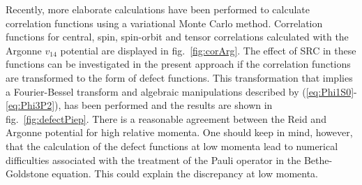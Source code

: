 Recently, more elaborate calculations\cite{PWP92} have been performed to  
calculate correlation functions using a variational Monte Carlo
method\cite{PWP92}. Correlation functions for central, spin, spin-orbit and 
tensor correlations calculated with the Argonne $v_{14}$  potential are 
displayed in fig.~\ref{fig:corArg}. 
The effect of SRC in these 
functions can be investigated in the present approach if the correlation 
functions are transformed to the form of defect functions. This transformation 
that implies a Fourier-Bessel transform and algebraic manipulations described 
by (\ref{eq:Phi1S0}-\ref{eq:Phi3P2}), has been performed and the results are 
shown in fig.~\ref{fig:defectPiep}.
There is a reasonable agreement between the Reid and 
Argonne potential for high relative momenta. One should keep in mind, however,
that the calculation of the defect functions at low momenta lead to numerical 
difficulties associated with the treatment of the Pauli operator in the 
Bethe-Goldstone equation\cite{MS93a}. This could explain the discrepancy at 
low momenta.

